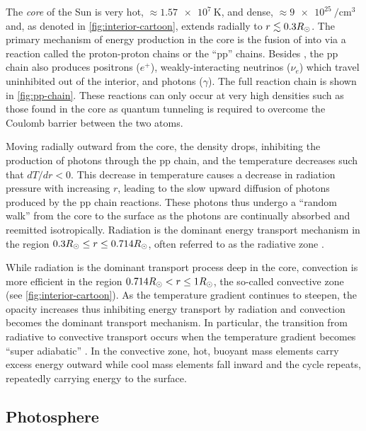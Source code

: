 The \textit{core} of the Sun is very hot, $\approx\SI{1.57e7}{\kelvin}$, and dense, $\approx\SI{9e25}{\per\cubic\cm}$ \citep{carroll_introduction_2007,bahcall_solar_2001} and, as denoted in \autoref{fig:interior-cartoon}, extends radially to $r\lesssim 0.3R_\odot$. The primary mechanism of energy production in the core is the fusion of  into  via a reaction called the proton-proton chains or the ``pp'' chains. Besides , the pp chain also produces positrons ($e^+$), weakly-interacting neutrinos ($\nu_e$) which travel uninhibited out of the interior, and photons ($\gamma$). The full reaction chain is shown in \autoref{fig:pp-chain}. These reactions can only occur at very high densities such as those found in the core as quantum tunneling is required to overcome the Coulomb barrier between the two  atoms.

Moving radially outward from the core, the density drops, inhibiting the production of photons through the pp chain, and the temperature decreases such that $dT/dr < 0$. This decrease in temperature causes a decrease in radiation pressure with increasing $r$, leading to the slow upward diffusion of photons produced by the pp chain reactions. These photons thus undergo a ``random walk'' from the core to the surface as the photons are continually absorbed and reemitted isotropically. Radiation is the dominant energy transport mechanism in the region $0.3R_\odot\le r\le 0.714R_\odot$, often referred to as the radiative zone \citep{carroll_introduction_2007}. 

While radiation is the dominant transport process deep in the core, convection is  more efficient in the region $0.714R_\odot<r\le1R_\odot$, the so-called convective zone (see \autoref{fig:interior-cartoon}). As the temperature gradient continues to steepen, the opacity increases thus inhibiting energy transport by radiation and convection becomes the dominant transport mechanism. In particular, the transition from radiative to convective transport occurs when the temperature gradient becomes ``super adiabatic'' \citep[see Section 10.4 of][]{carroll_introduction_2007}. In the convective zone, hot, buoyant mass elements carry excess energy outward while cool mass elements fall inward and the cycle repeats, repeatedly carrying energy to the surface. 

\subsection{Photosphere}\label{sec:photosphere}

